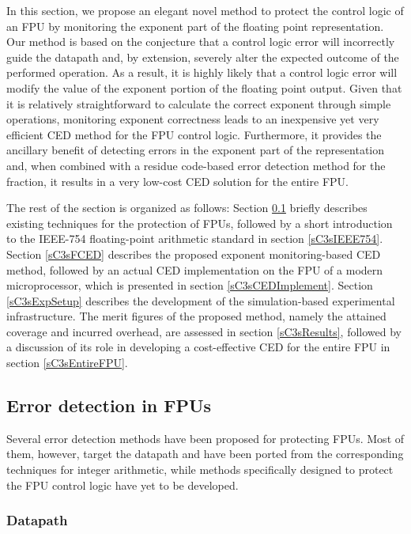\documentclass[12pt]{yalephd}
\begin{document}
In this section, we propose an elegant novel method to protect the control logic of an FPU by monitoring the exponent part of the floating point representation. Our method is based on the conjecture that a control logic error will incorrectly guide the datapath and, by extension, severely alter the expected outcome of the performed operation. As a result, it is highly likely that a control logic error will modify the value of the exponent portion of the floating point output. Given that it is relatively straightforward to calculate the correct exponent through simple operations, monitoring exponent correctness leads to an inexpensive yet very efficient CED method for the FPU control logic. Furthermore, it provides the ancillary benefit of detecting errors in the exponent part of the representation and, when combined with a residue code-based error detection method for the fraction, it results in a very low-cost CED solution for the entire FPU.

The rest of the section is organized as follows: Section \ref{sC3sErrorDet} briefly describes existing techniques for the protection of FPUs, followed by a short introduction to the IEEE-754 floating-point arithmetic standard in section \ref{sC3sIEEE754}. Section \ref{sC3sFCED} describes the proposed exponent monitoring-based CED method, followed by an actual CED implementation on the FPU of a modern microprocessor, which is presented in section \ref{sC3sCEDImplement}. Section \ref{sC3sExpSetup} describes the development of the simulation-based experimental infrastructure. The merit figures of the proposed method, namely the attained coverage and incurred overhead, are assessed in section \ref{sC3sResults}, followed by a discussion of its role in developing a cost-effective CED for the entire FPU in section \ref{sC3sEntireFPU}.

\subsection{Error detection in FPUs}\label{sC3sErrorDet}

Several error detection methods have been proposed for protecting FPUs. Most of them, however, target the datapath and have been ported from the corresponding techniques for integer arithmetic, while methods specifically designed to protect the FPU control logic have yet to be developed.

\subsubsection{Datapath}
\end{document}
